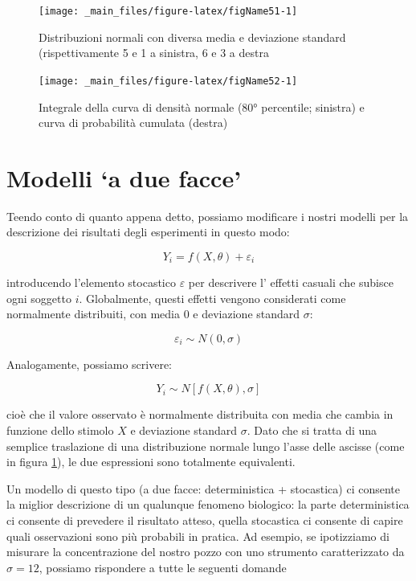 \documentclass[a4paper,12pt,oneside]{book}
\begin{document}
\begin{figure}

{\centering \texttt{[image: \_main\_files/figure-latex/figName51-1]} 

}

\caption{Distribuzioni normali con diversa media e deviazione standard (rispettivamente 5 e 1 a sinistra, 6 e 3 a destra}\label{fig:figName51}
\end{figure}

\begin{figure}

{\centering \texttt{[image: \_main\_files/figure-latex/figName52-1]} 

}

\caption{Integrale della curva di densità normale (80° percentile; sinistra) e curva di probabilità cumulata (destra)}\label{fig:figName52}
\end{figure}

\hypertarget{modelli-a-due-facce}{%
\section{Modelli `a due facce'}\label{modelli-a-due-facce}}

Teendo conto di quanto appena detto, possiamo modificare i nostri modelli per la descrizione dei risultati degli esperimenti in questo modo:

\[Y_i = f(X, \theta) + \varepsilon_i\]

introducendo l'elemento stocastico \(\varepsilon\) per descrivere l' effetti casuali che subisce ogni soggetto \(i\). Globalmente, questi effetti vengono considerati come normalmente distribuiti, con media 0 e deviazione standard \(\sigma\):

\[ \varepsilon_i \sim N(0, \sigma) \]

Analogamente, possiamo scrivere:

\[Y_i \sim N[f(X, \theta), \sigma]\]

cioè che il valore osservato è normalmente distribuita con media che cambia in funzione dello stimolo \(X\) e deviazione standard \(\sigma\). Dato che si tratta di una semplice traslazione di una distribuzione normale lungo l'asse delle ascisse (come in figura \ref{fig:figName51}), le due espressioni sono totalmente equivalenti.

Un modello di questo tipo (a due facce: deterministica + stocastica) ci consente la miglior descrizione di un qualunque fenomeno biologico: la parte deterministica ci consente di prevedere il risultato atteso, quella stocastica ci consente di capire quali osservazioni sono più probabili in pratica. Ad esempio, se ipotizziamo di misurare la concentrazione del nostro pozzo con uno strumento caratterizzato da \(\sigma = 12\), possiamo rispondere a tutte le seguenti domande
\end{document}
